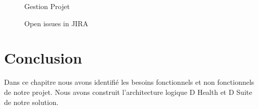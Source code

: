                                    \begin{figure}[H]
\centering
{}
\caption{Gestion Projet}
\label{fig:Mod-Enseig}
\end{figure}
                                   \begin{figure}[H]
\centering
{}
\caption{Open issues in JIRA}
\label{fig:Mod-Enseig}
\end{figure}
                   



\section*{Conclusion}
Dans ce chapitre nous avons identifié les besoins fonctionnels et non fonctionnels de notre projet. Nous avons construit l’architecture logique
D Health et D Suite de notre solution.